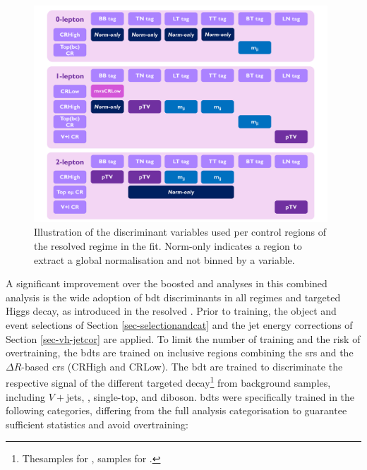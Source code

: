 \begin{figure}[h!]
  \center
  \includegraphics[width=0.98\textwidth]{Images/VH/Discriminants/Variables.pdf}
  \caption{Illustration of the discriminant variables used per control regions of the resolved regime in the fit. Norm-only indicates a region to extract a global normalisation and not binned by a variable.} %
  \label{fig:variablesControlReg}
\end{figure}

A significant improvement over the boosted \vhb and \vhc analyses in this combined analysis is the wide adoption of \gls{bdt} discriminants in all regimes and targeted Higgs decay, as introduced in the resolved \vhb \cite{ATLAS:2020fcp}. Prior to training, the object and event selections of Section \ref{sec-selectionandcat} and the jet energy corrections of Section \ref{sec-vh-jetcor} are applied. To limit the number of training and the risk of overtraining, the \gls{bdt}s are trained on inclusive regions combining the \gls{sr}s and the $\Delta R$-based \gls{cr}s (CRHigh and CRLow). The \gls{bdt} are trained to discriminate the respective signal of the different targeted decay\footnote{The\vhb samples for \vhb, \vhc samples for \vhc.} from background samples, including $V+$jets, \ttb, single-top, and diboson. \gls{bdt}s were specifically trained in the following categories, differing from the full analysis categorisation to guarantee sufficient statistics and avoid overtraining:

